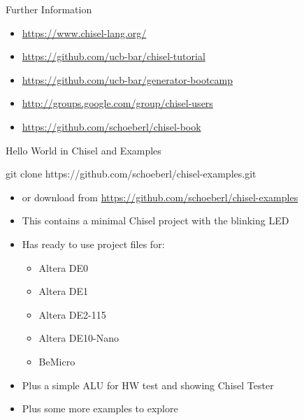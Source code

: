 \documentclass[xcolor=pdflatex,dvipsnames,table]{beamer}
\begin{document}
\begin{frame}[fragile]{Further Information}
\begin{itemize}
\item \url{https://www.chisel-lang.org/}
\item \url{https://github.com/ucb-bar/chisel-tutorial}
\item \url{https://github.com/ucb-bar/generator-bootcamp}
\item \url{http://groups.google.com/group/chisel-users}
\item \url{https://github.com/schoeberl/chisel-book}
\end{itemize}
\end{frame}


\begin{frame}[fragile]{Hello World in Chisel and Examples}
\begin{chisel}
git clone https://github.com/schoeberl/chisel-examples.git
\end{chisel}
\begin{itemize}
\item or download from \url{https://github.com/schoeberl/chisel-examples}
\item This contains a minimal Chisel project with the blinking LED
\item Has ready to use project files for:
\begin{itemize}
\item Altera DE0
\item Altera DE1
\item Altera DE2-115
\item Altera DE10-Nano
\item BeMicro
\end{itemize}
\item Plus a simple ALU for HW test and showing Chisel Tester
\item Plus some more examples to explore
\end{itemize}
\end{frame}
\end{document}
